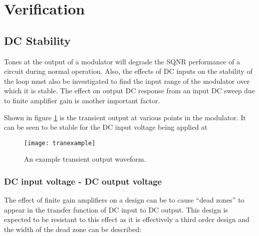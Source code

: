 \section{Verification}
\label{Verification}

    \subsection{DC Stability}
    \label{Verification:DCstab}
    Tones at the output of a modulator will degrade the SQNR performance of a circuit during normal operation.
    Also, the effects of DC inputs on the stability of the loop must also be investigated to find the input range of the modulator over which it is stable. 
    The effect on output DC response from an input DC sweep due to finite amplifier gain is another important factor.

    Shown in figure \ref{fig:tranexample} is the transient output at various points in the modulator.
    It can be seen to be stable for the DC input voltage being applied at %

    \begin{figure}
        \begin{center}
        \texttt{[image: tranexample]}
        \label{fig:tranexample}
        \caption{An example transient output waveform.}
        \end{center}
    \end{figure}


        \subsubsection{DC input voltage - DC output voltage}
        \label{Verification:DCinputoutput}
        The effect of finite gain amplifiers on a design can be to cause ``dead zones'' to appear in the transfer function of DC input to DC output.
        This design is expected to be resistant to this effect as it is effectively a third order design and the width of the dead zone can be described: 

